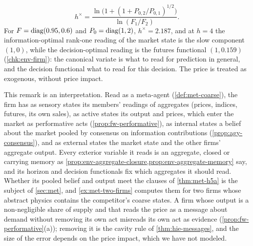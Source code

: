 \begin{example}
\[
h^\times=\frac{\ln\bigl(1+(1+P_{0,2}/P_{0,1})^{1/2}\bigr)}{\ln(F_1/F_2)}.
\]
For $F=\operatorname{diag}(0.95,0.6)$ and $P_0=\operatorname{diag}(1,2)$, $h^\times=2.187$, and at $h=4$ the information-optimal rank-one reading of the market state is the slow component $(1,0)$, while the decision-optimal reading is the futures functional $(1,0.159)$ (\cref{chk:env-firm}): the canonical variate is what to read for prediction in general, and the decision functional what to read for this decision. The price is treated as exogenous, without price impact.
\end{example}

\begin{remark}\label{rem:env-firm-meta-agent}
This remark is an interpretation. Read as a meta-agent (\cref{def:met-coarse}), the firm has as sensory states its members' readings of aggregates (prices, indices, futures, its own sales), as active states its output and prices, which enter the market as performative acts (\cref{prop:fw-performative}), as internal states a belief about the market pooled by consensus on information contributions (\cref{prop:agy-consensus}), and as external states the market state and the other firms' aggregate output. Every exterior variable it reads is an aggregate, closed or carrying memory as \cref{prop:env-aggregate-closure,prop:env-aggregate-memory} say, and its horizon and decision functionals fix which aggregates it should read. Whether its pooled belief and output meet the clauses of \cref{thm:met-h5a} is the subject of \cref{sec:met}, and \cref{ex:met-two-firms} computes them for two firms whose abstract physics contains the competitor's coarse states. A firm whose output is a non-negligible share of supply and that reads the price as a message about demand without removing its own act misreads its own act as evidence (\cref{prop:fw-performative}(a)); removing it is the cavity rule of \cref{thm:hie-messages}, and the size of the error depends on the price impact, which we have not modeled.
\end{remark}

